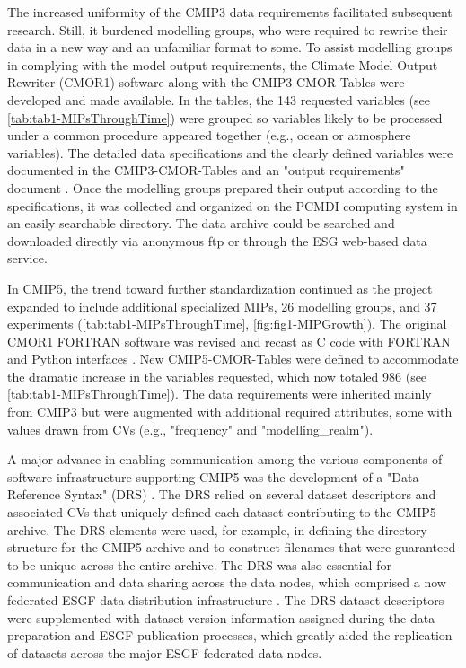 \documentclass[gmd, preprint]{copernicus}
\begin{document}
The increased uniformity of the CMIP3 data requirements facilitated subsequent research. Still, it burdened modelling groups, who were required to rewrite their data in a new way and an unfamiliar format to some. To assist modelling groups in complying with the model output requirements, the Climate Model Output Rewriter (CMOR1) software \citep{taylor_cmor_2006} along with the CMIP3-CMOR-Tables \citep{doutriaux_cmip3_2005} were developed and made available. In the tables, the 143 requested variables (see \autoref{tab:tab1-MIPsThroughTime}) were grouped so variables likely to be processed under a common procedure appeared together (e.g., ocean or atmosphere variables). The detailed data specifications and the clearly defined variables were documented in the CMIP3-CMOR-Tables and an "output requirements" document \citep{taylor_pcmdi_2005}. Once the modelling groups prepared their output according to the specifications, it was collected and organized on the PCMDI computing system in an easily searchable directory. The data archive could be searched and downloaded directly via anonymous ftp or through the ESG web-based data service.

In CMIP5, the trend toward further standardization continued as the project expanded to include additional specialized MIPs, 26 modelling groups, and 37 experiments (\autoref{tab:tab1-MIPsThroughTime}, \autoref{fig:fig1-MIPGrowth}). The original CMOR1 FORTRAN software was revised and recast as C code with FORTRAN and Python interfaces \citep{doutriaux_cmor_2011}. New CMIP5-CMOR-Tables \citep{doutriaux_cmip5_2013} were defined to accommodate the dramatic increase in the variables requested, which now totaled 986 (see \autoref{tab:tab1-MIPsThroughTime}). The data requirements were inherited mainly from CMIP3 but were augmented with additional required attributes, some with values drawn from CVs (e.g., "frequency" and "modelling\_realm").

A major advance in enabling communication among the various components of software infrastructure supporting CMIP5 was the development of a "Data Reference Syntax" (DRS) \citep{taylor_pcmdi_2012}. The DRS relied on several dataset descriptors and associated CVs that uniquely defined each dataset contributing to the CMIP5 archive. The DRS elements were used, for example, in defining the directory structure for the CMIP5 archive and to construct filenames that were guaranteed to be unique across the entire archive. The DRS was also essential for communication and data sharing across the data nodes, which comprised a now federated ESGF data distribution infrastructure \citep{williams_earth_2011}. The DRS dataset descriptors were supplemented with dataset version information assigned during the data preparation and ESGF publication processes, which greatly aided the replication of datasets across the major ESGF federated data nodes.
\end{document}

